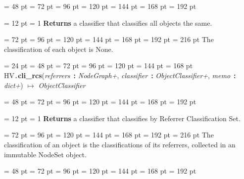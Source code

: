 {{{{\par \noindent  \leftskip = 48 pt  \leftmargini = 72 pt  \leftmarginii = 96 pt  \leftmarginiii = 120 pt  \leftmarginiv = 144 pt  \leftmarginv = 168 pt  \leftmarginvi = 192 pt {\par \noindent
{\par \pagebreak[3.100000] \noindent \hangindent = 12 pt \hangafter = 1 
{\bf Returns \/} a classifier that classifies all objects the same.\par}
{\par \noindent  \leftskip = 72 pt  \leftmargini = 96 pt  \leftmarginii = 120 pt  \leftmarginiii = 144 pt  \leftmarginiv = 168 pt  \leftmarginv = 192 pt  \leftmarginvi = 216 pt  The classification of each object is None.
\par}
\par}
\par}
\par}
\par}
{\par \noindent  \leftskip = 24 pt  \leftmargini = 48 pt  \leftmarginii = 72 pt  \leftmarginiii = 96 pt  \leftmarginiv = 120 pt  \leftmarginv = 144 pt  \leftmarginvi = 168 pt HV{\tt .\/}{\bf {\large {\bf cli{\_}rcs\/}}\/}({\em referrers\/}~{\bf :}  {\em NodeGraph+\/}, {\em classifier\/}~{\bf :}  {\em ObjectClassifier+\/}, {\em memo\/}~{\bf :}  {\em dict+\/}) \(\mapsto \)  {\em ObjectClassifier\/}{\par \noindent
{\par \noindent  \leftskip = 48 pt  \leftmargini = 72 pt  \leftmarginii = 96 pt  \leftmarginiii = 120 pt  \leftmarginiv = 144 pt  \leftmarginv = 168 pt  \leftmarginvi = 192 pt {\par \noindent
{\par \pagebreak[3.100000] \noindent \hangindent = 12 pt \hangafter = 1 
{\bf Returns \/} a classifier that classifies by Referrer Classification Set.\par}
{\par \noindent  \leftskip = 72 pt  \leftmargini = 96 pt  \leftmarginii = 120 pt  \leftmarginiii = 144 pt  \leftmarginiv = 168 pt  \leftmarginv = 192 pt  \leftmarginvi = 216 pt  The classification of an object is the classifications of its
referrers, collected in an immutable NodeSet object. 
\par}
\par}
\par}
{\par \noindent  \leftskip = 48 pt  \leftmargini = 72 pt  \leftmarginii = 96 pt  \leftmarginiii = 120 pt  \leftmarginiv = 144 pt  \leftmarginv = 168 pt  \leftmarginvi = 192 pt {\par \noindent
}}}}}
